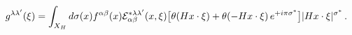 \begin{equation}
g^{\lambda\lambda'}(\xi)=\int_{X_H}
d\sigma(x)f^{\alpha\beta}(x){\cal
E}^{*\lambda\lambda'}_{\alpha\beta}(x,\xi)\big{[} \theta(H x\cdot
\xi) + \theta(-H x\cdot\xi)\,e^{+i\pi \sigma^{*} } \big{]}\vert H
x\cdot\xi\vert^{\sigma^{*}} \,.
\end{equation}

